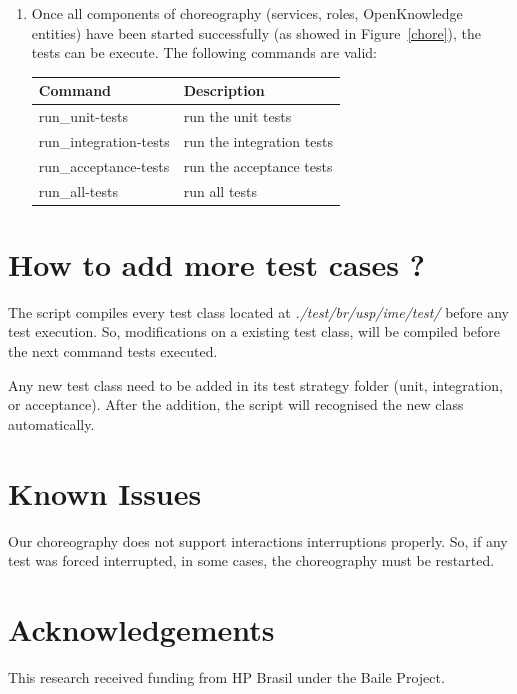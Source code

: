 \documentclass{article}	%
\begin{document}
\begin{enumerate}
  \item Once all components of choreography (services, roles, OpenKnowledge entities) have been started successfully (as showed in Figure~\ref{chore}), the tests can be execute. The following commands are valid:

  \begin{table}[htb]
  \centering
  \begin{tabular}{|l|l|}
  \hline
  Command & Description \\
  \hline
  \hline
  run\_unit-tests & run the unit tests\\
  run\_integration-tests & run the integration tests \\
  run\_acceptance-tests & run the acceptance tests \\
  run\_all-tests & run all tests \\
  \hline
  \end{tabular}
  \end{table}

\end{enumerate}


\section{ How to add more test cases ? }
The script compiles every test class located at \textit{./test/br/usp/ime/test/} before any test execution. So, modifications on a existing test class, will be compiled before the next command tests executed.

Any new test class need to be added in its test strategy folder (unit, integration, or acceptance). After the addition, the script will recognised the new class automatically. 

\section{ Known Issues }
Our choreography does not support interactions interruptions properly. So, if any test was forced interrupted, in some cases, the choreography must be restarted.

\section{Acknowledgements}
This research received funding from HP Brasil under the Baile Project.


\newpage

\end{document}
